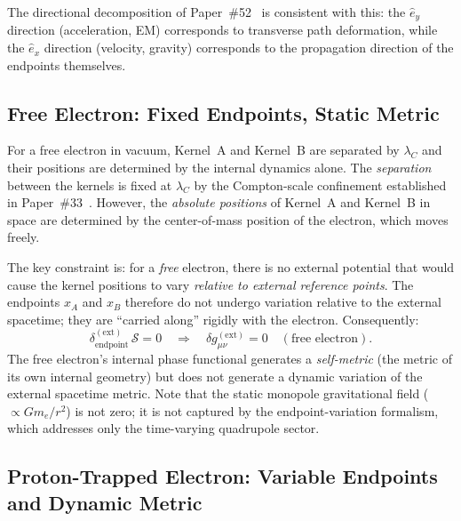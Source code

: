 \documentclass[%
 reprint, amsmath,amssymb, aps, prd, ]{revtex4-2}
\numberwithin{equation}{section}
\newcommand{\ehat}[1]{\hat{e}_{#1}}
\begin{document}
The directional decomposition of Paper~\#52~\cite{hanamura52} is consistent with this: the $\ehat{y}$ direction (acceleration, EM) corresponds to transverse path deformation, while the $\ehat{x}$ direction (velocity, gravity) corresponds to the propagation direction of the endpoints themselves.

\subsection{Free Electron: Fixed Endpoints, Static Metric}

For a free electron in vacuum, Kernel~A and Kernel~B are separated by $\lambda_C$ and their positions are determined by the internal dynamics alone.
The \emph{separation} between the kernels is fixed at $\lambda_C$ by the Compton-scale confinement established in Paper~\#33~\cite{hanamura33}.
However, the \emph{absolute positions} of Kernel~A and Kernel~B in space are determined by the center-of-mass position of the electron, which moves freely.

The key constraint is: for a \emph{free} electron, there is no external potential that would cause the kernel positions to vary \emph{relative to external reference points}.
The endpoints $x_A$ and $x_B$ therefore do not undergo variation relative to the external spacetime; they are ``carried along'' rigidly with the electron.
Consequently:
\begin{equation}
\delta_\mathrm{endpoint}^{(\mathrm{ext})}\,\mathcal{S} = 0
\quad \Rightarrow \quad
\delta g_{\mu\nu}^{(\mathrm{ext})} = 0
\quad (\text{free electron}).
\label{eq:free_metric}
\end{equation}
The free electron's internal phase functional generates a \emph{self-metric} (the metric of its own internal geometry) but does not generate a dynamic variation of the external spacetime metric.
Note that the static monopole gravitational field ($\propto Gm_e/r^2$) is not zero; it is not captured by the endpoint-variation formalism, which addresses only the time-varying quadrupole sector.

\subsection{Proton-Trapped Electron: Variable Endpoints and Dynamic Metric}
\end{document}
